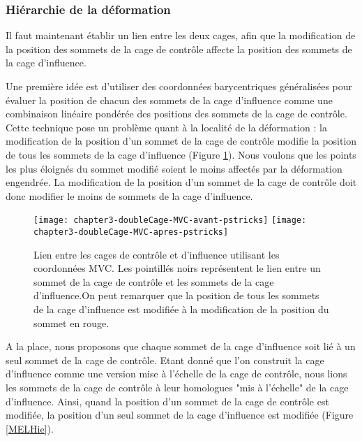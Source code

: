 \subsubsection{Hiérarchie de la déformation}

Il faut maintenant établir un lien entre les deux cages, afin que la
modification de la position des sommets de la cage de contrôle affecte la
position des sommets de la cage d'influence.

Une première idée est d'utiliser des coordonnées barycentriques généralisées
pour évaluer la position de chacun des sommets de la cage d'influence comme
une combinaison linéaire pondérée des positions des sommets de la cage de
contrôle. Cette technique pose un problème quant à la localité de la
déformation : la modification de la position d'un sommet de la cage de
contrôle modifie la position de tous les sommets de la cage d'influence
(Figure \ref{MELDMV}). Nous voulons que les points les plus éloignés du sommet
modifié soient le moins affectés par la déformation engendrée. La modification
de la position d'un sommet de la cage de contrôle doit donc modifier le moins
de sommets de la cage d'influence.

\begin{figure}[ht]
\begin{center}
  \texttt{[image: chapter3-doubleCage-MVC-avant-pstricks]}
  \texttt{[image: chapter3-doubleCage-MVC-apres-pstricks]}

  \caption[Lien double-cage MVC] {Lien entre les cages de contrôle et
d'influence utilisant les coordonnées MVC. Les pointillés noirs représentent
le lien entre un sommet de la cage de contrôle et les sommets de la cage
d'influence.On peut remarquer que la position de tous les sommets de la cage
d'influence est modifiée à la modification de la position du sommet en rouge.}

  \label{MELDMV}
\end{center}
\end{figure}

A la place, nous proposons que chaque sommet de la cage d'influence soit lié à
un seul sommet de la cage de contrôle. Etant donné que l'on construit la cage
d'influence comme une version mise à l'échelle de la cage de contrôle, nous
lions les sommets de la cage de contrôle à leur homologues "mis à l'échelle"
de la cage d'influence. Ainsi, quand la position d'un sommet de la cage de
contrôle est modifiée, la position d'un seul sommet de la cage d'influence est
modifiée (Figure \ref{MELHie}).


